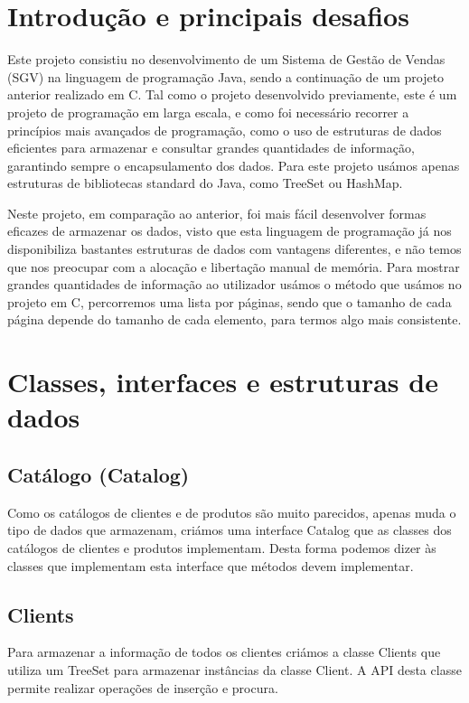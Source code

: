 \documentclass[a4paper]{report}
\begin{document}
	\tableofcontents
	
	\pagebreak
	
	\chapter{Introdução e principais desafios}
%	
	Este projeto consistiu no desenvolvimento de um Sistema de Gestão de Vendas (SGV) na linguagem de programação Java, sendo a continuação de um projeto anterior realizado em C. Tal como o projeto desenvolvido previamente, este é um projeto de programação em larga escala, e como foi necessário recorrer a princípios mais avançados de programação, como o uso de estruturas de dados eficientes para armazenar e consultar grandes quantidades de informação, garantindo sempre o encapsulamento dos dados. Para este projeto usámos apenas estruturas de bibliotecas standard do Java, como TreeSet ou HashMap.
	
	Neste projeto, em comparação ao anterior, foi mais fácil desenvolver formas eficazes de armazenar os dados, visto que esta linguagem de programação já nos disponibiliza bastantes estruturas de dados com vantagens diferentes, e não temos que nos preocupar com a alocação e libertação manual de memória. Para mostrar grandes quantidades de informação ao utilizador usámos o método que usámos no projeto em C, percorremos uma lista por páginas, sendo que o tamanho de cada página depende do tamanho de cada elemento, para termos algo mais consistente.
	
	\chapter{Classes, interfaces e estruturas de dados}
	\section{Catálogo (Catalog)}
	Como os catálogos de clientes e de produtos são muito parecidos, apenas muda o tipo de dados que armazenam, criámos uma interface Catalog que as classes dos catálogos de clientes e produtos implementam. Desta forma podemos dizer às classes que implementam esta interface que métodos devem implementar.
	
	\section{Clients}
	Para armazenar a informação de todos os clientes criámos a classe Clients que utiliza um TreeSet para armazenar instâncias da classe Client. A API desta classe permite realizar operações de inserção e procura.
	
\end{document}
